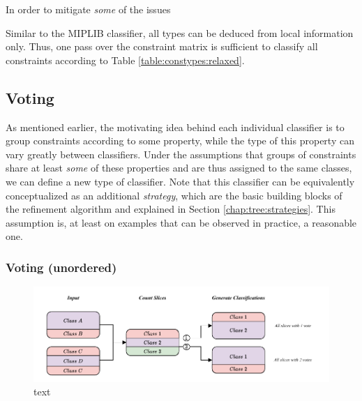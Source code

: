 			In order to mitigate \textit{some} of the issues 
			
			Similar to the MIPLIB classifier, all types can be deduced from local information only. Thus, one pass over the constraint matrix is sufficient to classify all constraints according to Table \ref{table:constypes:relaxed}. 
			
			\clearpage
			
		\subsection{Voting}
		\label{chap:tree:classifiers:voting}
		
			As mentioned earlier, the motivating idea behind each individual classifier is to group constraints according to some property, while the type of this property can vary greatly between classifiers.
			Under the assumptions that groups of constraints share at least \textit{some} of these properties and are thus assigned to the same classes, we can define a new type of classifier.
			Note that this classifier can be equivalently conceptualized as an additional \textit{strategy}, which are the basic building blocks of the refinement algorithm and explained in Section \ref{chap:tree:strategies}.
			This assumption is, at least on examples that can be observed in practice, a reasonable one.
			
			\subsubsection{Voting (unordered)}
			
				\begin{figure}[ht!]
					\centering
					\includegraphics[scale=1.05]{Bilder/DrawIO/strat_ordered_voting_pdf}
					\caption{text}
					\label{fig:tree:classifiers:ovoting}
				\end{figure}
			
